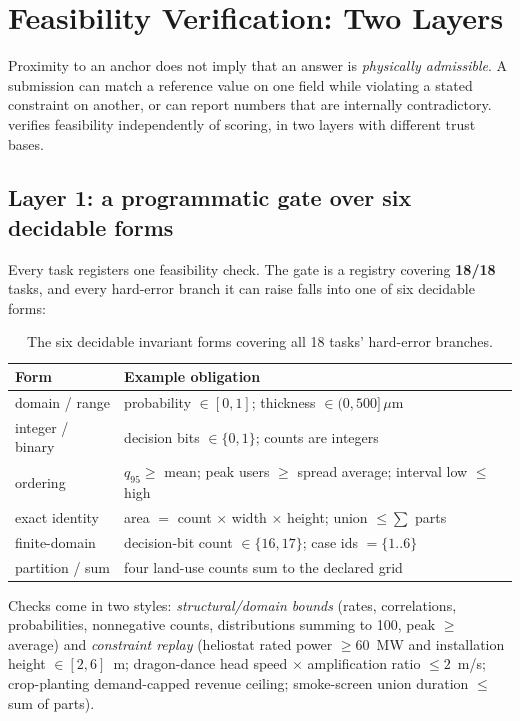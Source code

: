 \section{Feasibility Verification: Two Layers}
\label{sec:verification}

Proximity to an anchor does not imply that an answer is \emph{physically admissible}. A submission can match a reference value on one field while violating a stated constraint on another, or can report numbers that are internally contradictory. \bench{} verifies feasibility independently of scoring, in two layers with different trust bases.

\subsection{Layer 1: a programmatic gate over six decidable forms}
Every task registers one feasibility check. The gate is a registry covering \textbf{18/18} tasks, and every hard-error branch it can raise falls into one of six decidable forms:

\begin{table}[h]
\centering
\small
\caption{The six decidable invariant forms covering all 18 tasks' hard-error branches.}
\label{tab:invariants}
\begin{tabular}{@{}ll@{}}
\toprule
Form & Example obligation \\
\midrule
domain / range        & probability $\in[0,1]$; thickness $\in(0,500]\,\mu$m \\
integer / binary      & decision bits $\in\{0,1\}$; counts are integers \\
ordering              & $q_{95}\ge$ mean; peak users $\ge$ spread average; interval low $\le$ high \\
exact identity        & area $=$ count $\times$ width $\times$ height; union $\le \sum$ parts \\
finite-domain         & decision-bit count $\in\{16,17\}$; case ids $=\{1..6\}$ \\
partition / sum       & four land-use counts sum to the declared grid \\
\bottomrule
\end{tabular}
\end{table}

Checks come in two styles: \emph{structural/domain bounds} (rates, correlations, probabilities, nonnegative counts, distributions summing to 100, peak $\ge$ average) and \emph{constraint replay} (heliostat rated power $\ge 60$~MW and installation height $\in[2,6]$~m; dragon-dance head speed $\times$ amplification ratio $\le 2$~m/s; crop-planting demand-capped revenue ceiling; smoke-screen union duration $\le$ sum of parts).

